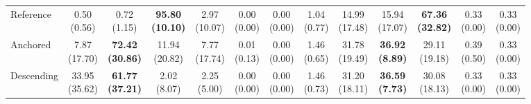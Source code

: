 {\begin{tabular}{l|cccccc|cccccc}
Reference & \makecell{0.50 \\ (0.56)} & {\cellcolor[HTML]{C8E6C9}} \makecell{0.72 \\ (1.15)} & \bfseries \makecell{95.80 \\ (10.10)} & \makecell{2.97 \\ (10.07)} & \makecell{0.00 \\ (0.00)} & \makecell{0.00 \\ (0.00)} & \makecell{1.04 \\ (0.77)} & {\cellcolor[HTML]{C8E6C9}} \makecell{14.99 \\ (17.48)} & \makecell{15.94 \\ (17.07)} & \bfseries \makecell{67.36 \\ (32.82)} & \makecell{0.33 \\ (0.00)} & \makecell{0.33 \\ (0.00)} \\
Anchored & \makecell{7.87 \\ (17.70)} & {\cellcolor[HTML]{C8E6C9}} \bfseries \makecell{72.42 \\ (30.86)} & \makecell{11.94 \\ (20.82)} & \makecell{7.77 \\ (17.74)} & \makecell{0.01 \\ (0.13)} & \makecell{0.00 \\ (0.00)} & \makecell{1.46 \\ (0.65)} & {\cellcolor[HTML]{C8E6C9}} \makecell{31.78 \\ (19.49)} & \bfseries \makecell{36.92 \\ (8.89)} & \makecell{29.11 \\ (19.18)} & \makecell{0.39 \\ (0.50)} & \makecell{0.33 \\ (0.00)} \\
Descending & \makecell{33.95 \\ (35.62)} & {\cellcolor[HTML]{C8E6C9}} \bfseries \makecell{61.77 \\ (37.21)} & \makecell{2.02 \\ (8.07)} & \makecell{2.25 \\ (5.00)} & \makecell{0.00 \\ (0.00)} & \makecell{0.00 \\ (0.00)} & \makecell{1.46 \\ (0.73)} & {\cellcolor[HTML]{C8E6C9}} \makecell{31.20 \\ (18.11)} & \bfseries \makecell{36.59 \\ (7.73)} & \makecell{30.08 \\ (18.13)} & \makecell{0.33 \\ (0.00)} & \makecell{0.33 \\ (0.00)} \\
\bottomrule
\end{tabular}
}%

